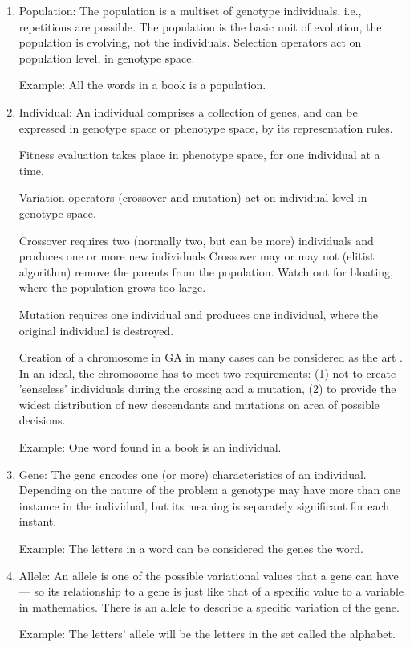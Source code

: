 \begin{enumerate}
\item Population: The population is a multiset of genotype individuals, i.e., repetitions are possible.
The population is the basic unit of evolution, the population is evolving, not the individuals.
Selection operators act on population level, in genotype space.

Example: 
All the words in a book is a population.

\item Individual:
An individual comprises a collection of genes, and can be expressed in genotype space or phenotype space, by its representation rules.

Fitness evaluation takes place in phenotype space, for one individual at a time.

Variation operators (crossover and mutation) act on individual level in genotype space.

Crossover requires two (normally two, but can be more) individuals and produces one or more new individuals Crossover may or may not (elitist algorithm) remove the parents from the population. Watch out for bloating, where the population grows too large.

Mutation requires one individual and produces one individual, where the original individual is destroyed.  

Creation of a chromosome in GA in many cases can be considered as the art \cite{Saenko2015}. In an ideal, the chromosome has to meet two requirements: (1) not to create 'senseless' individuals during the crossing and a mutation, (2) to provide the widest distribution of new descendants and mutations on area of possible decisions.

Example: 
One word found in a book is an individual.

\item Gene:
The gene encodes one (or more) characteristics of an individual. Depending on the nature of the problem a genotype may have more than one instance in the individual, but its meaning is separately significant for each instant. 

Example: 
The letters in a word can be considered the genes the word.


\item Allele:
An allele is one of the possible variational values that a gene can have --- so its relationship to a gene is just like that of a specific value to a variable in mathematics. 
There is an allele to describe a specific variation of the gene.

Example: 
The letters' allele will be the letters in the set called the alphabet.
\end{enumerate}


